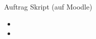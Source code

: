 %


\begin{frame}[fragile]{Auftrag}
Skript (auf Moodle)
\begin{itemize}
\item {}
\item {}
\end{itemize}
\end{frame}

